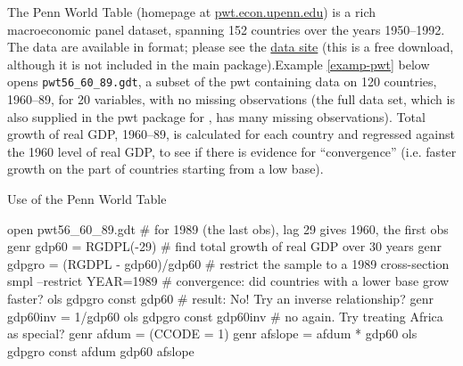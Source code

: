 The Penn World Table (homepage at
\href{http://pwt.econ.upenn.edu/}{pwt.econ.upenn.edu}) is a rich
macroeconomic panel dataset, spanning 152 countries over the years
1950--1992.  The data are available in  format; please see
the 
\href{http://gretl.sourceforge.net/gretl_data.html}{data site} (this
is a free download, although it is not included in the main
 package).Example \ref{examp-pwt} below opens
\verb+pwt56_60_89.gdt+, a subset of the pwt containing data on 120
countries, 1960--89, for 20 variables, with no missing observations
(the full data set, which is also supplied in the pwt package for
, has many missing observations). Total growth of real GDP,
1960--89, is calculated for each country and regressed against the
1960 level of real GDP, to see if there is evidence for
``convergence'' (i.e. faster growth on the part of countries starting
from a low base).

\begin{script}[htbp]
  \caption{Use of the Penn World Table}
  \label{examp-pwt}

\begin{code}
	  open pwt56_60_89.gdt 
	  # for 1989 (the last obs), lag 29 gives 1960, the first obs 
	  genr gdp60 = RGDPL(-29) 
	  # find total growth of real GDP over 30 years
	  genr gdpgro = (RGDPL - gdp60)/gdp60
	  # restrict the sample to a 1989 cross-section 
	  smpl --restrict YEAR=1989 
	  # convergence: did countries with a lower base grow faster?  
	  ols gdpgro const gdp60 
	  # result: No! Try an inverse relationship?
	  genr gdp60inv = 1/gdp60 
	  ols gdpgro const gdp60inv 
	  # no again.  Try treating Africa as special? 
	  genr afdum = (CCODE = 1)
	  genr afslope = afdum * gdp60 
	  ols gdpgro const afdum gdp60 afslope 
\end{code}
\end{script}



